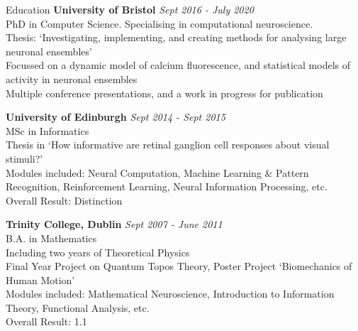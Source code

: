 \documentclass{resume} %
\begin{document}

\begin{rSection}{Education}
{\bf University of Bristol} \hfill {\em Sept 2016 - July 2020} \\
PhD in Computer Science. Specialising in computational neuroscience. \\
Thesis: `Investigating, implementing, and creating methods for analysing large neuronal ensembles' \\
Focussed on a dynamic model of calcium fluorescence, and statistical models of activity in neuronal ensembles \\
Multiple conference presentations, and a work in progress for publication

{\bf University of Edinburgh} \hfill {\em Sept 2014 - Sept 2015} \\
MSc in Informatics \\
Thesis in `How informative are retinal ganglion cell responses about visual stimuli?' \\
Modules included: Neural Computation, Machine Learning \& Pattern Recognition, Reinforcement Learning, Neural Information Processing, etc.  \smallskip \\
Overall Result: Distinction

{\bf Trinity College, Dublin} \hfill {\em Sept 2007 - June 2011} \\
B.A. in Mathematics \\
Including two years of Theoretical Physics \\
Final Year Project on Quantum Topos Theory, Poster Project `Biomechanics of Human Motion' \\
Modules included: Mathematical Neuroscience, Introduction to Information Theory, Functional Analysis, etc. \smallskip \\
Overall Result: 1.1

\end{rSection}

\end{document}
